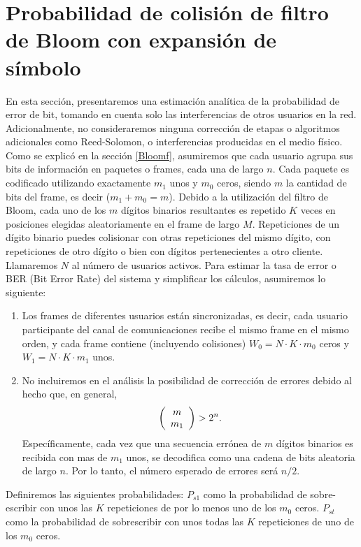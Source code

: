 \section{Probabilidad de colisión de filtro de Bloom con expansión de símbolo}

En esta sección, presentaremos una estimación analítica de la probabilidad de error de bit, tomando en cuenta solo las interferencias de otros usuarios en la red.
Adicionalmente, no consideraremos ninguna corrección de etapas o algoritmos adicionales como Reed-Solomon, o interferencias producidas en el medio físico.
Como se explicó en la sección \ref{Bloomf}, asumiremos que cada usuario agrupa sus bits de información en paquetes o frames, cada una de largo $n$. Cada paquete es codificado utilizando exactamente $m_{1}$ unos y $m_{0}$ ceros, siendo $m$ la cantidad de bits del frame, es decir ($m_{1}+m_{0}=m$). Debido a la utilización del filtro de Bloom, cada uno de los $m$ dígitos binarios resultantes es repetido $K$ veces en posiciones elegidas aleatoriamente en el frame de largo $M$. Repeticiones de un dígito binario puedes colisionar con otras repeticiones del mismo dígito, con repeticiones de otro dígito o bien con dígitos pertenecientes a otro cliente.
Llamaremos $N$ al número de usuarios activos. Para estimar la tasa de error o BER (Bit Error Rate) del sistema y simplificar los cálculos, asumiremos lo siguiente:

\begin{enumerate}
 \item Los frames de diferentes usuarios están sincronizadas, es decir, cada usuario participante del canal de comunicaciones recibe el mismo frame en el mismo orden, y cada frame contiene (incluyendo colisiones) $W_0 = N\cdot K\cdot m_0$ ceros y $W_1 = N\cdot K\cdot m_1$ unos.
 \item No incluiremos en el análisis la posibilidad de corrección de errores debido al hecho que, en general, 
 \begin{equation}
\left(\begin{array}{c} m \\ m_1\end{array}\right) > 2^n.
\end{equation}
Específicamente, cada vez que una secuencia errónea de $m$ dígitos binarios es recibida con mas de $m_1$ unos, se decodifica como una cadena de bits aleatoria de largo $n$.
Por lo tanto, el número esperado de errores será $n/2$.
\end{enumerate}

Definiremos las siguientes probabilidades: 
$P_{s1}$ como la probabilidad de sobre-escribir con unos las $K$ repeticiones de por lo menos uno de los $m_0$ ceros.
$P_{st}$ como la probabilidad de sobrescribir con unos todas las $K$ repeticiones de uno de los $m_0$ ceros.

